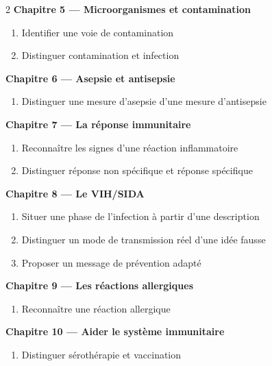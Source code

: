 \begin{multicols}{2}
\textbf{\normalsize\color{onbo}Chapitre 5 --- Microorganismes et contamination}
\begin{enumerate}[label=\arabic*.,itemsep=1pt,topsep=2pt,leftmargin=1.6em]
\item Identifier une voie de contamination
\item Distinguer contamination et infection
\end{enumerate}
\vspace{4pt}

\textbf{\normalsize\color{onbo}Chapitre 6 --- Asepsie et antisepsie}
\begin{enumerate}[label=\arabic*.,itemsep=1pt,topsep=2pt,leftmargin=1.6em]
\item Distinguer une mesure d'asepsie d'une mesure d'antisepsie
\end{enumerate}
\vspace{4pt}

\textbf{\normalsize\color{onbo}Chapitre 7 --- La réponse immunitaire}
\begin{enumerate}[label=\arabic*.,itemsep=1pt,topsep=2pt,leftmargin=1.6em]
\item Reconnaître les signes d'une réaction inflammatoire
\item Distinguer réponse non spécifique et réponse spécifique
\end{enumerate}
\vspace{4pt}

\textbf{\normalsize\color{onbo}Chapitre 8 --- Le VIH/SIDA}
\begin{enumerate}[label=\arabic*.,itemsep=1pt,topsep=2pt,leftmargin=1.6em]
\item Situer une phase de l'infection à partir d'une description
\item Distinguer un mode de transmission réel d'une idée fausse
\item Proposer un message de prévention adapté
\end{enumerate}
\vspace{4pt}

\textbf{\normalsize\color{onbo}Chapitre 9 --- Les réactions allergiques}
\begin{enumerate}[label=\arabic*.,itemsep=1pt,topsep=2pt,leftmargin=1.6em]
\item Reconnaître une réaction allergique
\end{enumerate}
\vspace{4pt}

\textbf{\normalsize\color{onbo}Chapitre 10 --- Aider le système immunitaire}
\begin{enumerate}[label=\arabic*.,itemsep=1pt,topsep=2pt,leftmargin=1.6em]
\item Distinguer sérothérapie et vaccination
\end{enumerate}
\vspace{4pt}


\end{multicols}
